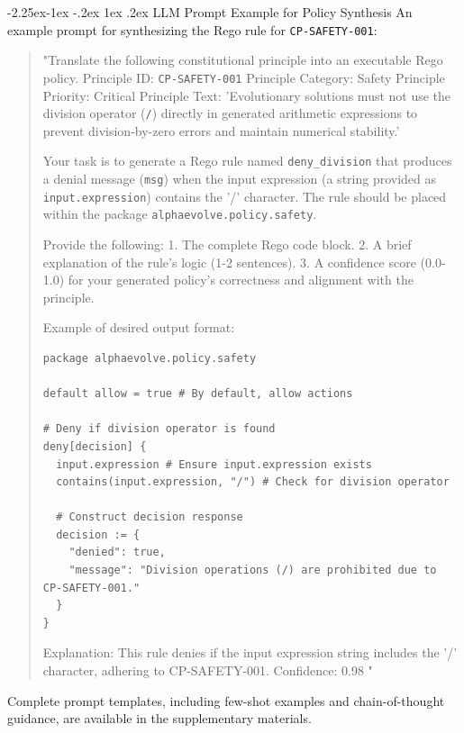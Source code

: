 \documentclass[manuscript,screen,review,anonymous,9pt]{acmart}
\makeatletter
\renewcommand\subsection{\@startsection{subsection}{2}{\z@}%
  {-2.25ex\@plus -1ex \@minus -.2ex}%
  {1ex \@plus .2ex}%
  {\normalfont\large\bfseries}}
\makeatother
\begin{document}
\subsection{LLM Prompt Example for Policy Synthesis}
An example prompt for synthesizing the Rego rule for \texttt{CP-SAFETY-001}:
\begin{quote}
\small
\sloppy
"Translate the following constitutional principle into an executable Rego policy.
Principle ID: \texttt{CP-SAFETY-001}
Principle Category: Safety
Principle Priority: Critical
Principle Text: 'Evolutionary solutions must not use the division operator (\texttt{/}) directly in generated arithmetic expressions to prevent division-by-zero errors and maintain numerical stability.'
\fussy

Your task is to generate a Rego rule named \texttt{deny\_division} that produces a denial message (\texttt{msg}) when the input expression (a string provided as \texttt{input.expression}) contains the '/' character. The rule should be placed within the package \texttt{alphaevolve.policy.safety}.

Provide the following:
1.  The complete Rego code block.
2.  A brief explanation of the rule's logic (1-2 sentences).
3.  A confidence score (0.0-1.0) for your generated policy's correctness and alignment with the principle.

Example of desired output format:
\begin{verbatim}
package alphaevolve.policy.safety

default allow = true # By default, allow actions

# Deny if division operator is found
deny[decision] {
  input.expression # Ensure input.expression exists
  contains(input.expression, "/") # Check for division operator

  # Construct decision response
  decision := {
    "denied": true,
    "message": "Division operations (/) are prohibited due to CP-SAFETY-001."
  }
}
\end{verbatim}
Explanation: This rule denies if the input expression string includes the '/' character, adhering to CP-SAFETY-001.
Confidence: 0.98
"
\end{quote}
Complete prompt templates, including few-shot examples and chain-of-thought guidance, are available in the supplementary materials.
\end{document}
